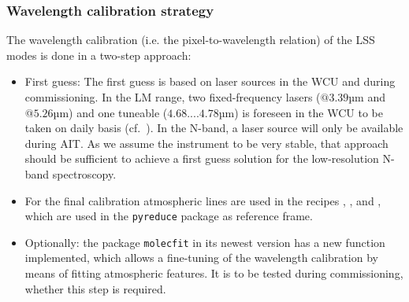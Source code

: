\subsubsection{Wavelength calibration strategy}\label{ssec:wavecal}
The wavelength calibration (i.e. the pixel-to-wavelength relation) of the \ac{LSS} modes is done in a two-step approach:
\begin{itemize}
    \item First guess: The first guess is based on laser sources in the \ac{WCU} and during commissioning.  In the LM range, two fixed-frequency lasers ($@3.39$µm and $@5.26$µm) and one tuneable ($4.68....4.78$µm) is foreseen in the \ac{WCU} to be taken on daily basis (cf.~\cite{METIS-calibration_plan}). In the N-band, a laser source will only be available during \ac{AIT}. As we assume the instrument to be very stable, that approach should be sufficient to achieve a first guess solution for the low-resolution N-band spectroscopy.
    \item For the final calibration atmospheric lines are used in the recipes ,  ,  and , which are used in the \texttt{pyreduce} package as reference frame.
    \item Optionally: the package \texttt{molecfit} in its newest version has a new function implemented, which allows a fine-tuning of the wavelength calibration by means of fitting atmospheric features. It is to be tested during commissioning, whether this step is required.
\end{itemize}

